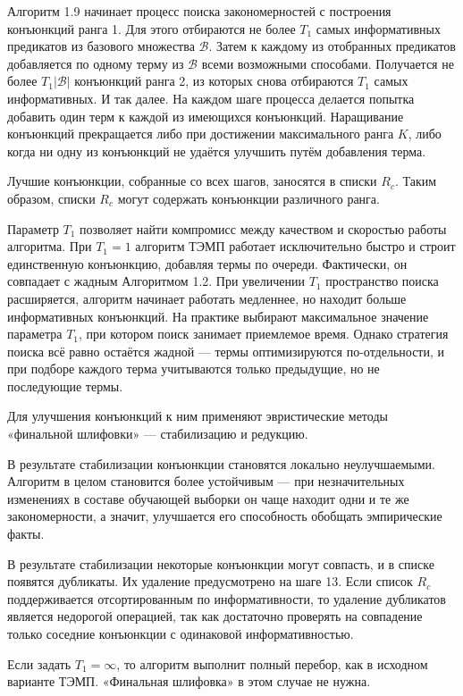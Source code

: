 Алгоритм 1.9 начинает процесс поиска закономерностей с построения конъюнкций ранга 1. Для этого отбираются не более $T_1$ самых информативных предикатов из базового множества $\mathcal{B}$. Затем к каждому из отобранных предикатов добавляется по одному терму из $\mathcal{B}$ всеми возможными способами. Получается не более $T_1|\mathcal{B}|$ конъюнкций ранга 2, из которых снова отбираются $T_1$ самых информативных. И так далее. На каждом шаге процесса делается попытка добавить один терм к каждой из имеющихся конъюнкций. Наращивание конъюнкций прекращается либо при достижении максимального ранга $K$, либо когда ни одну из конъюнкций не удаётся улучшить путём добавления терма.

Лучшие конъюнкции, собранные со всех шагов, заносятся в списки $R_c$. Таким образом, списки $R_c$ могут содержать конъюнкции различного ранга.

Параметр $T_1$ позволяет найти компромисс между качеством и скоростью работы алгоритма. При $T_1 = 1$ алгоритм ТЭМП работает исключительно быстро и строит единственную конъюнкцию, добавляя термы по очереди. Фактически, он совпадает с жадным Алгоритмом 1.2. При увеличении $T_1$ пространство поиска расширяется, алгоритм начинает работать медленнее, но находит больше информативных конъюнкций. На практике выбирают максимальное значение параметра $T_1$, при котором поиск занимает приемлемое время. Однако стратегия поиска всё равно остаётся жадной — термы оптимизируются по-отдельности, и при подборе каждого терма учитываются только предыдущие, но не последующие термы.

Для улучшения конъюнкций к ним применяют эвристические методы «финальной шлифовки» — стабилизацию и редукцию.

В результате стабилизации конъюнкции становятся локально неулучшаемыми. Алгоритм в целом становится более устойчивым — при незначительных изменениях в составе обучающей выборки он чаще находит одни и те же закономерности, а значит, улучшается его способность обобщать эмпирические факты.

В результате стабилизации некоторые конъюнкции могут совпасть, и в списке появятся дубликаты. Их удаление предусмотрено на шаге 13. Если список $R_c$ поддерживается отсортированным по информативности, то удаление дубликатов является недорогой операцией, так как достаточно проверять на совпадение только соседние конъюнкции с одинаковой информативностью.

Если задать $T_1 = \infty$, то алгоритм выполнит полный перебор, как в исходном варианте ТЭМП. «Финальная шлифовка» в этом случае не нужна.

